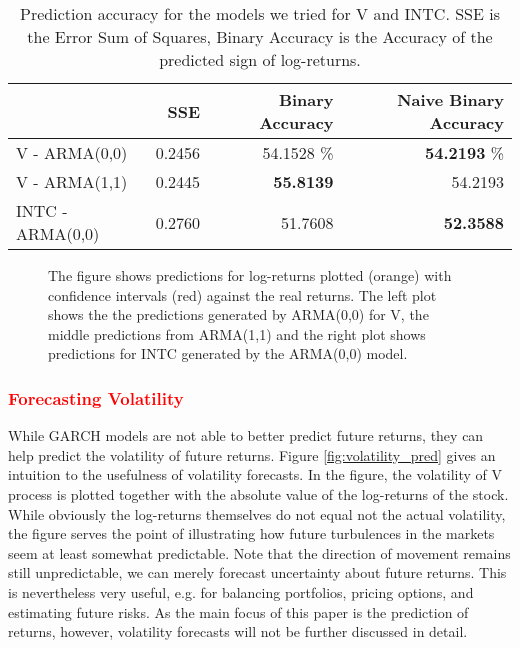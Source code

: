 \begin{table}[]
    \centering
    \small
    \begin{tabular}{lrrr}
    \toprule
    {}  & SSE & Binary Accuracy & Naive Binary Accuracy \\
    \midrule
    V - ARMA(0,0) & 0.2456 & 54.1528 \% & \textbf{54.2193} \% \\
    V - ARMA(1,1) & 0.2445 & \textbf{55.8139} & 54.2193 \\
    INTC - ARMA(0,0) & 0.2760 & 51.7608 & \textbf{52.3588} \\
    \bottomrule
    \end{tabular}
    \caption{Prediction accuracy for the models we tried for V and INTC. SSE is the Error Sum of Squares, Binary Accuracy is the Accuracy of the predicted sign of log-returns.}
    \label{tab:V_INTC_ARMA_predictions}
\end{table}{}

\begin{figure}[h]
    \centering
    \begin{adjustbox}{width = 0.95\textwidth}
    
    
    
    \end{adjustbox}
    \caption{The figure shows predictions for log-returns plotted (orange) with confidence intervals (red) against the real returns. The left plot shows the the predictions generated by ARMA(0,0) for V, the middle predictions from ARMA(1,1) and the right plot shows predictions for INTC generated by the ARMA(0,0) model.}
    \label{fig:V_INTC_ARMA_predictions_plot}
\end{figure}{}

\subsubsection{\textcolor{red}{Forecasting Volatility}}
While GARCH models are not able to better predict future returns, they can help predict the volatility of future returns. Figure \ref{fig:volatility_pred} gives an intuition to the usefulness of volatility forecasts. In the figure, the volatility of V process is plotted together with the absolute value of the log-returns of the stock. While obviously the log-returns themselves do not equal not the actual volatility, the figure serves the point of illustrating how future turbulences in the markets seem at least somewhat predictable. Note that the direction of movement remains still unpredictable, we can merely forecast uncertainty about future returns. This is nevertheless very useful, e.g. for balancing portfolios, pricing options, and estimating future risks. As the main focus of this paper is the prediction of returns, however, volatility forecasts will not be further discussed in detail.

